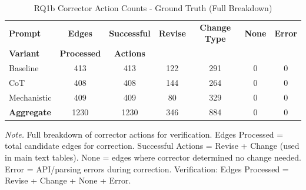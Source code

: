 \begin{table}[H]
\centering
\caption{RQ1b Corrector Action Counts - Ground Truth (Full Breakdown)}
\label{tab:rq1b_action_counts_groundtruth}
\begin{threeparttable}
\begin{tabular}{lcccccc}
\toprule
\textbf{Prompt} & \textbf{Edges} & \textbf{Successful} & \textbf{Revise} & \textbf{Change Type} & \textbf{None} & \textbf{Error} \\
\textbf{Variant} & \textbf{Processed} & \textbf{Actions} & & & & \\
\midrule
Baseline & 413 & 413 & 122 & 291 & 0 & 0 \\
CoT & 408 & 408 & 144 & 264 & 0 & 0 \\
Mechanistic & 409 & 409 & 80 & 329 & 0 & 0 \\
\midrule
\textbf{Aggregate} & 1230 & 1230 & 346 & 884 & 0 & 0 \\
\bottomrule
\end{tabular}
\begin{tablenotes}
\small
\item \textit{Note.} Full breakdown of corrector actions for verification. 
Edges Processed = total candidate edges for correction.
Successful Actions = Revise + Change (used in main text tables).
None = edges where corrector determined no change needed.
Error = API/parsing errors during correction.
Verification: Edges Processed = Revise + Change + None + Error.
\end{tablenotes}
\end{threeparttable}
\end{table}
